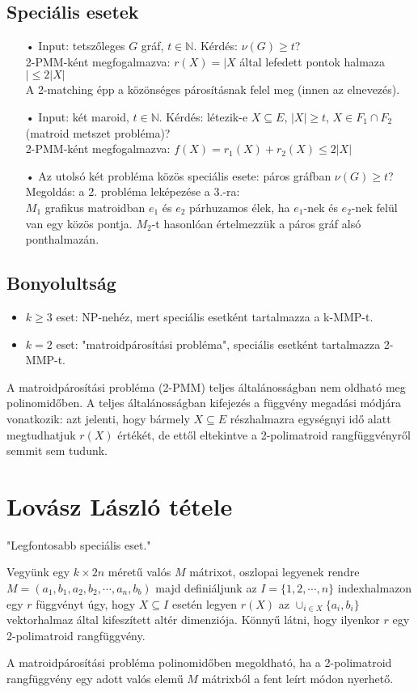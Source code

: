 \subsection*{Speciális esetek}
\begin{itemize}
\item[•] Input: tetszőleges $G$ gráf, $t\in \mathbb{N}$. Kérdés: $\nu(G)\geq t$?\\
2-PMM-ként megfogalmazva: $r(X)=|X$ által lefedett pontok halmaza $|\leq 2|X|$\\
A 2-matching épp a közönséges párosításnak felel meg (innen az elnevezés).
\item[•] Input: két maroid, $t\in \mathbb{N}$. Kérdés: létezik-e $X\subseteq E$, $|X|\geq t$, $X\in F_{1}\cap F_{2}$ (matroid metszet probléma)?\\
2-PMM-ként megfogalmazva: $f(X)=r_{1}(X)+r_{2}(X)\leq 2|X|$
\item[•] Az utolsó két probléma közös speciális esete: páros gráfban $\nu (G)\geq t$?\\
Megoldás: a 2. probléma leképezése a 3.-ra:\\
$M_{1}$ grafikus matroidban $e_{1}$ és $e_{2}$ párhuzamos élek, ha $e_{1}$-nek és $e_{2}$-nek felül van egy közös pontja. $M_{2}$-t hasonlóan értelmezzük a páros gráf alsó ponthalmazán.
\end{itemize}

\subsection*{Bonyolultság}
\begin{itemize}
\item $k\geq 3$ eset: NP-nehéz, mert speciális esetként tartalmazza a k-MMP-t.
\item $k=2$ eset: "matroidpárosítási probléma", speciális esetként tartalmazza 2-MMP-t.
\end{itemize}

\begin{theo}
A matroidpárosítási probléma (2-PMM) teljes általánosságban nem oldható meg polinomidőben. A teljes általánosságban kifejezés a függvény megadási módjára vonatkozik: azt jelenti, hogy bármely $X\subseteq E$ részhalmazra egységnyi idő alatt megtudhatjuk $r(X)$ értékét, de ettől eltekintve a 2-polimatroid rangfüggvényről semmit sem tudunk.
\end{theo}


\section*{Lovász László tétele}
"Legfontosabb speciális eset."
\begin{theo}
Vegyünk egy $k\times 2n$ méretű valós $M$ mátrixot, oszlopai legyenek rendre $M=(a_{1},b_{1},a_{2},b_{2},\cdots ,a_{n},b_{b})$ majd definiáljunk az $I=\lbrace 1,2,\cdots ,n\rbrace$ indexhalmazon egy $r$ függvényt úgy, hogy $X\subseteq I$ esetén legyen $r(X)$ az $\cup_{i\in X}\lbrace a_{i},b_{i}\rbrace$ vektorhalmaz által kifeszített altér dimenziója. Könnyű látni, hogy ilyenkor $r$ egy 2-polimatroid rangfüggvény.
\end{theo}

\begin{theo}
A matroidpárosítási probléma polinomidőben megoldható, ha a 2-polimatroid rangfüggvény egy adott valós elemű $M$ mátrixból a fent leírt módon nyerhető.
\end{theo}
